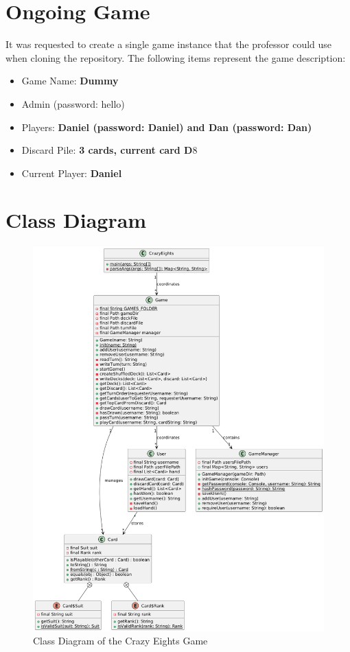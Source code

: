 \documentclass[conference]{IEEEtran}
\begin{document}
\section{Ongoing Game}
It was requested to create a single game instance that the professor could use when cloning the repository. The following items represent the game description:

\begin{itemize}
    \item Game Name: \textbf{Dummy}
    \item Admin (password: hello)
    \item Players: \textbf{Daniel (password: Daniel) and Dan (password: Dan)}
    \item Discard Pile: \textbf{3 cards, current card D$8$}
    \item Current Player: \textbf{Daniel}
\end{itemize}

\section{Class Diagram}
\begin{figure}[H]
    \centering
    \includegraphics[width=0.8\linewidth]{class/diagram.png}
    \caption{Class Diagram of the Crazy Eights Game}
    \label{fig:class_diagram}
\end{figure}
\end{document}
